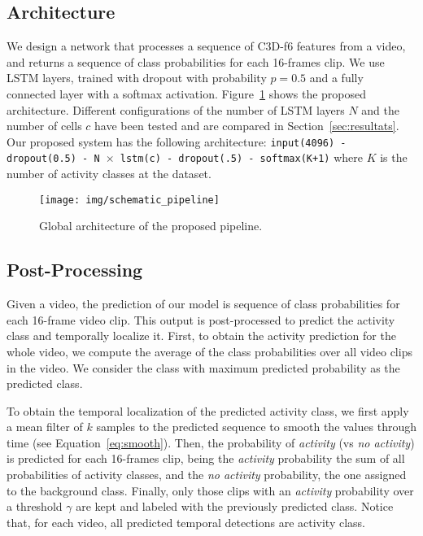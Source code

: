 \documentclass{article}
\begin{document}
\subsection{Architecture}
\label{sec:architecture}
We design a network that processes a sequence of C3D-f6 features from a video, and returns a sequence of class probabilities for each 16-frames clip.
We use LSTM layers, trained with dropout with probability $p = 0.5$ and a fully connected layer with a softmax activation. Figure~\ref{fig:global_pipeline} shows the proposed architecture.
Different configurations of the number of LSTM layers $N$ and the number of cells $c$ have been tested and are compared in Section~\ref{sec:resultats}.
Our proposed system has the following architecture: \texttt{input(4096) - dropout(0.5) - N $\times$ lstm(c) - dropout(.5) - softmax(K+1)} where $K$ is the number of activity classes at the dataset.

\begin{figure}[ht]
\centering
\texttt{[image: img/schematic\_pipeline]}
\caption{Global architecture of the proposed pipeline.}
\label{fig:global_pipeline}
\end{figure}




\subsection{Post-Processing}
Given a video, the prediction of our model is sequence of class probabilities for each 16-frame video clip. This output is post-processed to predict the activity class and temporally localize it.
First, to obtain the activity prediction for the whole video, we compute the average of the class probabilities over all video clips in the video.
We consider the class with maximum predicted probability as the predicted class.



To obtain the temporal localization of the predicted activity class, we first apply a mean filter of $k$ samples to the predicted sequence to smooth the values through time (see Equation~\ref{eq:smooth}).
Then, the probability of \textit{activity} (vs \textit{no activity}) is predicted for each 16-frames clip, being the \textit{activity} probability the sum of all probabilities of activity classes, and the \textit{no activity} probability, the one assigned to the background class.
Finally, only those clips with an \textit{activity} probability over a threshold $\gamma$ are kept and labeled with the previously predicted class.
Notice that, for each video, all predicted temporal detections are activity class.
\end{document}
